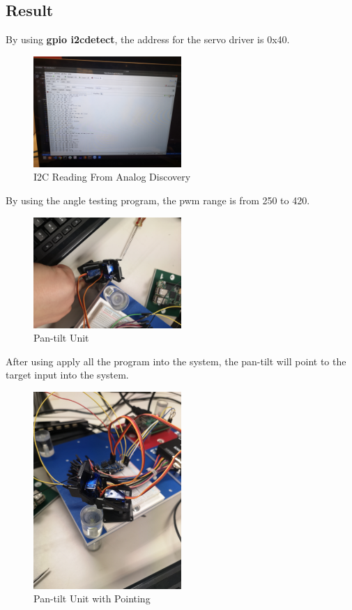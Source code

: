 \documentclass{article}
\begin{document}
\subsection{Result}
By using \textbf{gpio i2cdetect}, the address for the servo driver is 0x40.
\begin{figure}[hb]
	\centering
	\includegraphics[width=0.5\textwidth]{img/Lab03_04.jpg}
	\caption{I2C Reading From Analog Discovery} 
	\label{BBD}
\end{figure}
By using the angle testing program, the pwm range is from 250 to 420.
\begin{figure}[hb]
	\centering
	\includegraphics[width=0.5\textwidth]{img/Lab03_06.jpg}
	\caption{Pan-tilt Unit} 
	\label{BBD}
\end{figure}
After using apply all the program into the system, the pan-tilt will point to the target input into the system.
\begin{figure}[hb]
	\centering
	\includegraphics[width=0.5\textwidth]{img/Lab03_01.jpg}
	\caption{Pan-tilt Unit with Pointing} 
	\label{BBD}
\end{figure}
\clearpage
\end{document}
